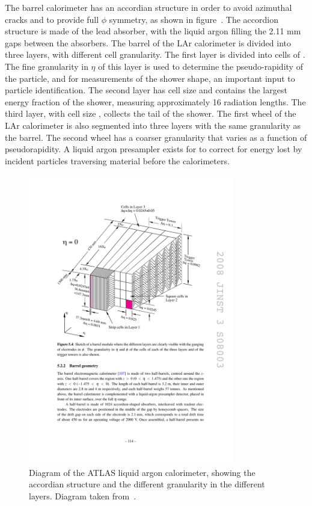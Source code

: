 The barrel calorimeter has an accordian structure in order to avoid azimuthal
cracks and to provide full $\phi$ symmetry, as shown in
figure~. The accordion structure is made of
the lead absorber, with the liquid argon filling the 2.11 mm gaps between the
absorbers. The barrel of the LAr calorimeter is divided into three layers, with
different cell granularity. The first layer is divided into cells of 
. The fine granularity in $\eta$ of this layer
is used to determine the pseudo-rapidity of the particle, and for measurements
of the shower shape, an important input to particle identification. The
second layer has cell size  and contains the
largest energy fraction of the shower, measuring approximately 16 radiation 
lengths. The third layer, with cell size , collects
the tail of the shower. The first wheel of the LAr calorimeter is also segmented into
three layers with the same granularity as the barrel. The second wheel has a
coarser granularity that varies as a function of pseudorapidity. A liquid argon
presampler exists for  to correct for energy lost by incident
particles traversing material before the calorimeters.


\begin{figure}[h]
\centering
\includegraphics[width=0.8\textwidth]{lar-diagram}
\caption{Diagram of the ATLAS liquid argon calorimeter, showing the accordian
structure and the different granularity in the different layers. Diagram taken
from~\cite{1748-0221-3-08-S08003}.}
\label{fig:lar-diagram}
\end{figure}

